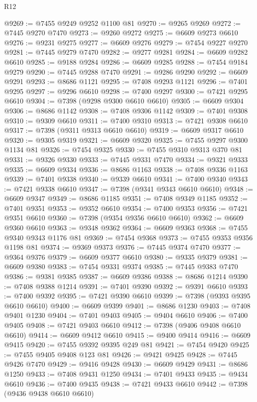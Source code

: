 \begin{lexlean}{R12}
\begin{coremodule}
@9269 := @7455 @9249 @9252 @1100 @81
@9270 := @9265 @9269
@9272 := @7445 @9270 @7470
@9273 := @9260 @9272
@9275 := @6609 @9273 @6610
@9276 := @9231 @9275
@9277 := @6609 @9276
@9279 := @7454 @9227 @9270
@9281 := @7445 @9279 @7470
@9282 := @9277 @9281
@9284 := @6609 @9282 @6610
@9285 := @9188 @9284
@9286 := @6609 @9285
@9288 := @7454 @9184 @9279
@9290 := @7445 @9288 @7470
@9291 := @9286 @9290
@9292 := @6609 @9291
@9293 := @8686 @1121
@9295 := @7408 @9293 @1121
@9296 := @7401 @9295
@9297 := @9296 @6610
@9298 := @7400 @9297
@9300 := @7421 @9295 @6610
@9304 := @7398 (@9298 @9300 @6610 @6610)
@9305 := @6609 @9304
@9306 := @8686 @1142
@9308 := @7408 @9306 @1142
@9309 := @7401 @9308
@9310 := @9309 @6610
@9311 := @7400 @9310
@9313 := @7421 @9308 @6610
@9317 := @7398 (@9311 @9313 @6610 @6610)
@9319 := @6609 @9317 @6610
@9320 := @9305 @9319
@9321 := @6609 @9320
@9325 := @7455 @9297 @9300 @1134 @81
@9326 := @7454 @9325
@9330 := @7455 @9310 @9313 @370 @81
@9331 := @9326 @9330
@9333 := @7445 @9331 @7470
@9334 := @9321 @9333
@9335 := @6609 @9334
@9336 := @8686 @1163
@9338 := @7408 @9336 @1163
@9339 := @7401 @9338
@9340 := @9339 @6610
@9341 := @7400 @9340
@9343 := @7421 @9338 @6610
@9347 := @7398 (@9341 @9343 @6610 @6610)
@9348 := @6609 @9347
@9349 := @8686 @1185
@9351 := @7408 @9349 @1185
@9352 := @7401 @9351
@9353 := @9352 @6610
@9354 := @7400 @9353
@9356 := @7421 @9351 @6610
@9360 := @7398 (@9354 @9356 @6610 @6610)
@9362 := @6609 @9360 @6610
@9363 := @9348 @9362
@9364 := @6609 @9363
@9368 := @7455 @9340 @9343 @1176 @81
@9369 := @7454 @9368
@9373 := @7455 @9353 @9356 @1198 @81
@9374 := @9369 @9373
@9376 := @7445 @9374 @7470
@9377 := @9364 @9376
@9379 := @6609 @9377 @6610
@9380 := @9335 @9379
@9381 := @6609 @9380
@9383 := @7454 @9331 @9374
@9385 := @7445 @9383 @7470
@9386 := @9381 @9385
@9387 := @6609 @9386
@9388 := @8686 @1214
@9390 := @7408 @9388 @1214
@9391 := @7401 @9390
@9392 := @9391 @6610
@9393 := @7400 @9392
@9395 := @7421 @9390 @6610
@9399 := @7398 (@9393 @9395 @6610 @6610)
@9400 := @6609 @9399
@9401 := @8686 @1230
@9403 := @7408 @9401 @1230
@9404 := @7401 @9403
@9405 := @9404 @6610
@9406 := @7400 @9405
@9408 := @7421 @9403 @6610
@9412 := @7398 (@9406 @9408 @6610 @6610)
@9414 := @6609 @9412 @6610
@9415 := @9400 @9414
@9416 := @6609 @9415
@9420 := @7455 @9392 @9395 @249 @81
@9421 := @7454 @9420
@9425 := @7455 @9405 @9408 @123 @81
@9426 := @9421 @9425
@9428 := @7445 @9426 @7470
@9429 := @9416 @9428
@9430 := @6609 @9429
@9431 := @8686 @1250
@9433 := @7408 @9431 @1250
@9434 := @7401 @9433
@9435 := @9434 @6610
@9436 := @7400 @9435
@9438 := @7421 @9433 @6610
@9442 := @7398 (@9436 @9438 @6610 @6610)

\end{coremodule}
\end{lexlean}
